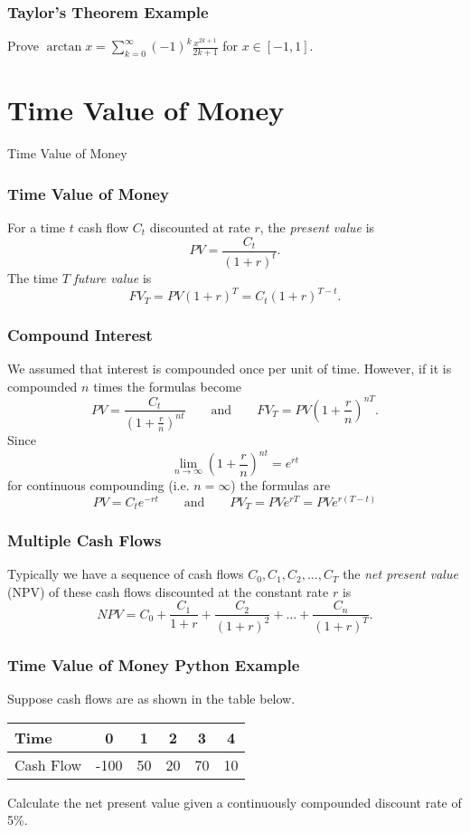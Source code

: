 \documentclass{beamer}
\begin{document}
\begin{frame}[t]
\frametitle{Taylor's Theorem Example}
\begin{Example}
Prove $\displaystyle\arctan x = \sum_{k = 0}^\infty (-1)^k \frac{x^{2k + 1}}{2k+ 1}$ for $x\in [-1, 1]$.
\end{Example}
\end{frame}

\section{Time Value of Money}

\begin{frame}
\begin{center}
\Huge Time Value of Money
\end{center}
\end{frame}

\begin{frame}
\frametitle{Time Value of Money}

For a time $t$ cash flow $C_t$ discounted at rate $r$, the {\it present value} is
$$
PV = \frac{C_t}{(1 + r)^t}.
$$
The time $T$ {\it future value} is
$$
FV_T = PV (1 + r)^T = C_t (1 + r)^{T- t}.
$$
\end{frame}

\begin{frame}
\frametitle{Compound Interest}
\small 
We assumed that interest is compounded once per unit of time. However, if it is compounded $n$ times the formulas become
$$
PV = \frac{C_t}{\left(1 + \frac{r}{n}\right)^{nt}}\qquad\text{and}\qquad FV_T = PV \left(1 + \frac{r}{n}\right)^{nT}.
$$
Since
$$
\lim_{n\to\infty} \left(1 + \frac{r}{n}\right)^{nt} = e^{rt}
$$
for continuous compounding (i.e. $n = \infty$) the formulas are
$$
PV = C_t e^{-rt} \qquad\text{and}\qquad PV_T = PV  e^{rT} = PV  e^{r(T - t)}
$$
\end{frame}

\begin{frame}
\frametitle{Multiple Cash Flows} 
Typically we have a sequence of cash flows $C_0, C_1, C_2,\ldots, C_T$ the {\it net present value} (NPV) of these cash flows discounted at the constant rate $r$ is
$$
NPV = C_0 + \frac{C_1}{1 + r} + \frac{C_2}{(1 + r)^2} + \ldots + \frac{C_n}{(1 + r)^T}.
$$
\end{frame}

\begin{frame}
\frametitle{Time Value of Money Python Example}
\small
\begin{Example}
Suppose cash flows are as shown in the table below.
\begin{center}
\begin{tabular}{| l | c c c c c |}
\hline
Time			&	0		&	1	&	2	&	3	&	4\\\hline
Cash Flow	&	-100		&	50	&	20	&	70	&	10\\\hline
\end{tabular}
\end{center}
Calculate the net present value given a continuously compounded discount rate of 5\%.
\end{Example}
\end{frame}
\end{document}
